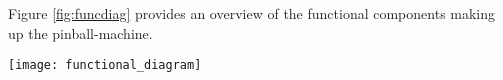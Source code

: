 Figure \ref{fig:funcdiag} provides an overview of the functional components making up the pinball-machine.
\begin{figure*}
	\texttt{[image: functional\_diagram]}
	\caption{Overview of the main electrical components in the pinball-machine.}
	\label{fig:funcdiag}
\end{figure*}
